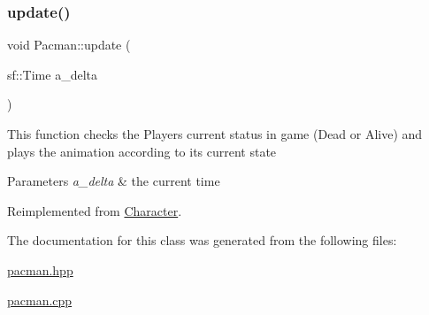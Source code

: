 \subsubsection{\texorpdfstring{update()}{update()}}
{\footnotesize\ttfamily void Pacman\+::update (\begin{DoxyParamCaption}\item[{sf\+::\+Time}]{a\+\_\+delta }\end{DoxyParamCaption})\hspace{0.3cm}{\ttfamily [virtual]}}

This function checks the Player\textquotesingle{}s current status in game (Dead or Alive) and plays the animation according to it\textquotesingle{}s current state


\begin{DoxyParams}{Parameters}
{\em a\+\_\+delta} & the current time \\
\hline
\end{DoxyParams}


Reimplemented from \hyperlink{class_character_a89b72b507971ba8648909980d045ed06}{Character}.



The documentation for this class was generated from the following files\+:\begin{DoxyCompactItemize}
\item 
\hyperlink{pacman_8hpp}{pacman.\+hpp}\item 
\hyperlink{pacman_8cpp}{pacman.\+cpp}\end{DoxyCompactItemize}

